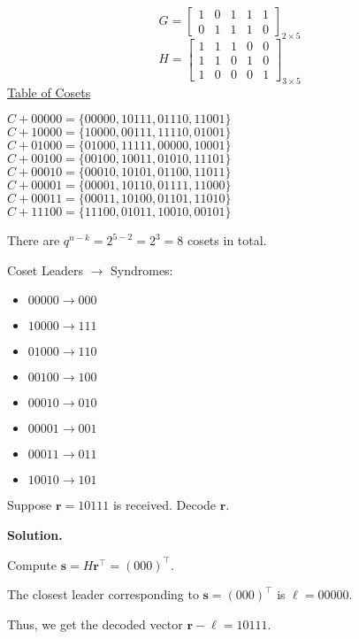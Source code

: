 \begin{exbox}
    \begin{example}
        \[ G=\begin{bmatrix}
                1 & 0 & 1 & 1 & 1 \\
                0 & 1 & 1 & 1 & 0
            \end{bmatrix}_{2\times 5} \]
        \[ H=\begin{bmatrix}
                1 & 1 & 1 & 0 & 0 \\
                1 & 1 & 0 & 1 & 0 \\
                1 & 0 & 0 & 0 & 1
            \end{bmatrix}_{3\times 5} \]
        \underline{Table of Cosets}
        \begin{center}
            \begin{multicols}{2}
                $ C+00000=\{00000,10111,01110,11001\} $\\
                $ C+10000=\{10000,00111,11110,01001\} $\\
                $ C+01000=\{01000,11111,00000,10001\} $\\
                $ C+00100=\{00100,10011,01010,11101\} $\\
                $ C+00010=\{00010,10101,01100,11011\} $\\
                $ C+00001=\{00001,10110,01111,11000\} $\\
                $ C+00011=\{00011,10100,01101,11010\} $\\
                $ C+11100=\{11100,01011,10010,00101\} $
            \end{multicols}
        \end{center}
        There are $ q^{n-k}=2^{5-2}=2^3=8 $ cosets in total.

        Coset Leaders $ \rightarrow $ Syndromes:
        \begin{itemize}
            \item $ 00000 \rightarrow 000 $
            \item $ 10000 \rightarrow 111 $
            \item $ 01000 \rightarrow 110 $
            \item $ 00100 \rightarrow 100 $
            \item $ 00010 \rightarrow 010 $
            \item $ 00001 \rightarrow 001 $
            \item $ 00011 \rightarrow 011 $
            \item $ 10010 \rightarrow 101 $
        \end{itemize}
        Suppose $ \bm{r}=10111 $ is received. Decode $ \bm{r} $.

        \textbf{Solution.}

        Compute $ \bm{s}=H\bm{r}^\top=(000)^\top $.

        The closest leader corresponding to $ \bm{s}=(000)^\top $ is $ \bm{\ell}=00000 $.

        Thus, we get the decoded vector $ \bm{r}-\bm{\ell}=10111 $.
    \end{example}
\end{exbox}
